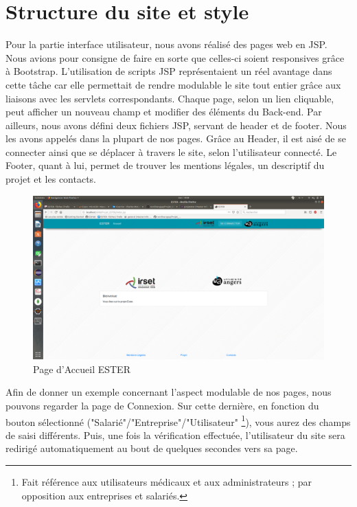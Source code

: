\section{Structure du site et style}


Pour la partie interface utilisateur, nous avons réalisé des pages web en JSP. Nous avions pour consigne de faire en sorte que celles-ci soient responsives grâce à Bootstrap. L'utilisation de scripts JSP représentaient un réel avantage dans cette tâche car elle permettait de rendre modulable le site tout entier grâce aux liaisons avec les servlets correspondants. Chaque page, selon un lien cliquable, peut afficher un nouveau champ et modifier des éléments du Back-end. Par ailleurs, nous avons défini deux fichiers JSP, servant de header et de footer. Nous les avons appelés dans la plupart de nos pages. Grâce au Header, il est aisé de se connecter ainsi que se déplacer à travers le site, selon l'utilisateur connecté. Le Footer, quant à lui, permet de trouver les mentions légales, un descriptif du projet et les contacts.

\begin{figure}[ht]
    \begin{center}
	\includegraphics[scale=0.2,trim=4cm 0cm 4cm 5.3cm, clip=true]{img/ESTER}
    \end{center}
    \caption{Page d'Accueil ESTER}
\end{figure}

Afin de donner un exemple concernant l'aspect modulable de nos pages, nous pouvons regarder la page de Connexion. Sur cette dernière, en fonction du bouton sélectionné ("Salarié"/"Entreprise"/"Utilisateur" \footnote{Fait référence aux utilisateurs médicaux et aux administrateurs ; par opposition aux entreprises et salariés.}), vous aurez des champs de saisi différents. Puis, une fois la vérification effectuée, l'utilisateur du site sera redirigé automatiquement au bout de quelques secondes vers sa page.

